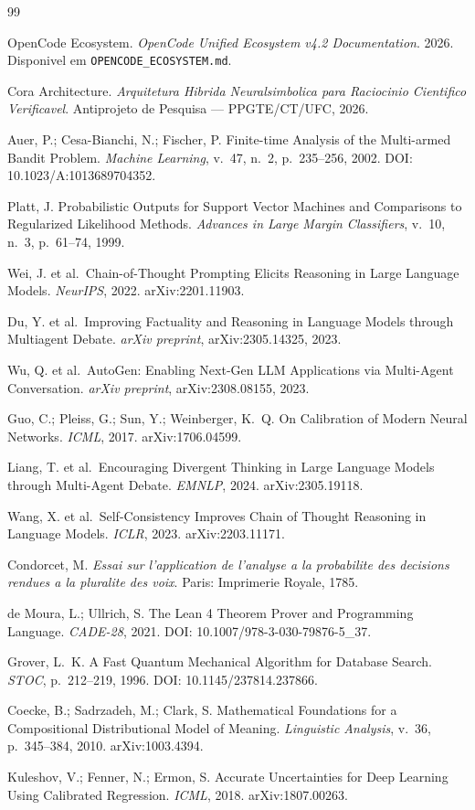\documentclass[5p]{elsarticle}
\begin{document}
\begin{thebibliography}{99}

OpenCode Ecosystem. \textit{OpenCode Unified Ecosystem v4.2 Documentation}. 2026. Disponivel em \texttt{OPENCODE\_ECOSYSTEM.md}.

Cora Architecture. \textit{Arquitetura Hibrida Neuralsimbolica para Raciocinio Cientifico Verificavel}. Antiprojeto de Pesquisa --- PPGTE/CT/UFC, 2026.

Auer, P.; Cesa-Bianchi, N.; Fischer, P. Finite-time Analysis of the Multi-armed Bandit Problem. \textit{Machine Learning}, v.~47, n.~2, p.~235--256, 2002. DOI: 10.1023/A:1013689704352.

Platt, J. Probabilistic Outputs for Support Vector Machines and Comparisons to Regularized Likelihood Methods. \textit{Advances in Large Margin Classifiers}, v.~10, n.~3, p.~61--74, 1999.

Wei, J. et al.\ Chain-of-Thought Prompting Elicits Reasoning in Large Language Models. \textit{NeurIPS}, 2022. arXiv:2201.11903.

Du, Y. et al.\ Improving Factuality and Reasoning in Language Models through Multiagent Debate. \textit{arXiv preprint}, arXiv:2305.14325, 2023.

Wu, Q. et al.\ AutoGen: Enabling Next-Gen LLM Applications via Multi-Agent Conversation. \textit{arXiv preprint}, arXiv:2308.08155, 2023.

Guo, C.; Pleiss, G.; Sun, Y.; Weinberger, K.~Q. On Calibration of Modern Neural Networks. \textit{ICML}, 2017. arXiv:1706.04599.

Liang, T. et al.\ Encouraging Divergent Thinking in Large Language Models through Multi-Agent Debate. \textit{EMNLP}, 2024. arXiv:2305.19118.

Wang, X. et al.\ Self-Consistency Improves Chain of Thought Reasoning in Language Models. \textit{ICLR}, 2023. arXiv:2203.11171.

Condorcet, M. \textit{Essai sur l'application de l'analyse a la probabilite des decisions rendues a la pluralite des voix}. Paris: Imprimerie Royale, 1785.

de Moura, L.; Ullrich, S. The Lean 4 Theorem Prover and Programming Language. \textit{CADE-28}, 2021. DOI: 10.1007/978-3-030-79876-5\_37.

Grover, L.~K. A Fast Quantum Mechanical Algorithm for Database Search. \textit{STOC}, p.~212--219, 1996. DOI: 10.1145/237814.237866.

Coecke, B.; Sadrzadeh, M.; Clark, S. Mathematical Foundations for a Compositional Distributional Model of Meaning. \textit{Linguistic Analysis}, v.~36, p.~345--384, 2010. arXiv:1003.4394.

Kuleshov, V.; Fenner, N.; Ermon, S. Accurate Uncertainties for Deep Learning Using Calibrated Regression. \textit{ICML}, 2018. arXiv:1807.00263.

\end{thebibliography}
\end{document}
